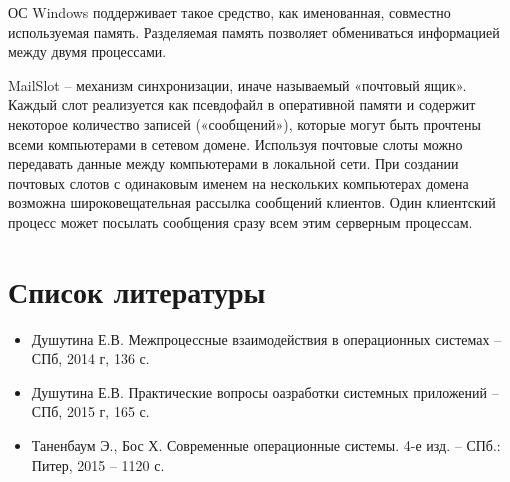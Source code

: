 \documentclass[a4paper]{article}
\begin{document}
	ОС Windows поддерживает такое средство, как именованная, совместно используемая память. Разделяемая память позволяет обмениваться информацией между двумя процессами.
	
	MailSlot – механизм синхронизации, иначе называемый «почтовый ящик». Каждый слот реализуется как псевдофайл в оперативной памяти и содержит некоторое количество записей («сообщений»), которые могут быть прочтены всеми компьютерами в сетевом домене. Используя почтовые слоты можно передавать данные между компьютерами в локальной сети. При создании почтовых слотов с одинаковым именем на нескольких компьютерах домена возможна широковещательная рассылка сообщений клиентов. Один клиентский процесс может посылать сообщения сразу всем этим серверным процессам.

\section{Список литературы}
\begin{itemize}
\item Душутина Е.В.  Межпроцессные взаимодействия в операционных системах – СПб, 2014 г, 136 с.
\item Душутина Е.В.  Практические вопросы оазработки системных приложений – СПб, 2015 г, 165 с.
\item Таненбаум Э., Бос Х. Современные операционные системы. 4-е изд. – СПб.: Питер, 2015 – 1120 с.
\end{itemize}
	
\end{document}
